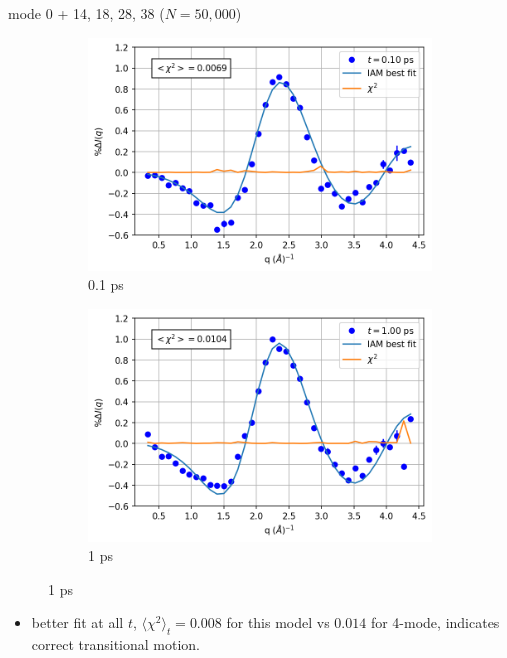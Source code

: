 \documentclass{beamer}
\newcommand\w{0.32}
\begin{document}
\begin{frame}{mode 0 + 14, 18, 28, 38 ($N=50{,}000$)}
\begin{figure}
\begin{subfigure}[b]{\w\textwidth}
			\includegraphics[width=\textwidth]{figures/20000_0+vstrongmodes_0.10.png}
			\caption{0.1 ps}
		\end{subfigure}
		\begin{subfigure}[b]{\w\textwidth}
			\centering
			\includegraphics[width=\textwidth]{figures/20000_0+vstrongmodes_1.00.png}
			\caption{1 ps}
		\end{subfigure}
	\end{figure}
\begin{itemize}
	\item better fit at all $t$, $\langle\chi^2\rangle_t = 0.008$ for this model vs $0.014$ for 4-mode, indicates correct transitional motion.
\end{itemize}
\end{frame}
\end{document}
